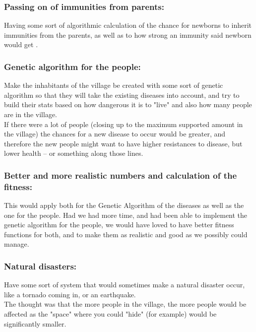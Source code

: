 \documentclass[conference,compsoc]{IEEEtran}
\begin{document}
\subsubsection*{Passing on of immunities from parents:}
Having some sort of algorithmic calculation of the chance for newborns to inherit immunities from the parents, as well as to how strong an immunity said newborn would get \cite{DSDimmunology}.\\

\subsubsection*{Genetic algorithm for the people:}
Make the inhabitants of the village be created with some sort of genetic algorithm so that they will take the existing diseases into account, and try to build their stats based on how dangerous it is to "live" and also how many people are in the village.\\ 
If there were a lot of people (closing up to the maximum supported amount in the village) the chances for a new disease to occur would be greater, and therefore the new people might want to have higher resistances to disease, but lower health – or something along those lines.\\

\subsubsection*{Better and more realistic numbers and calculation of the fitness:}
This would apply both for the Genetic Algorithm of the diseases as well as the one for the people. Had we had more time, and had been able to implement the genetic algorithm for the people, we would have loved to have better fitness functions for both, and to make them as realistic and good as we possibly could manage.\\

\subsubsection*{Natural disasters:}
Have some sort of system that would sometimes make a natural disaster occur, like a tornado coming in, or an earthquake.\\
The thought was that the more people in the village, the more people would be affected as the "space" where you could "hide" (for example) would be significantly smaller.\\
\end{document}
